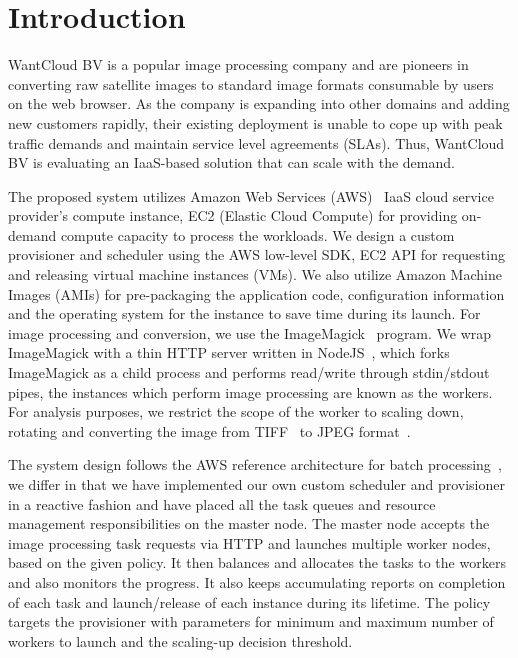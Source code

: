 \documentclass[a4paper]{IEEEtran}
\begin{document}
\section{Introduction}

WantCloud BV is a popular image processing company and are pioneers in converting raw satellite images to standard image formats consumable by users on the web browser. As the company is expanding into other domains and 
adding new customers rapidly, their existing deployment is unable to cope up with peak traffic demands and
 maintain service level agreements (SLAs). Thus, WantCloud BV is evaluating an IaaS-based solution that
 can scale with the demand.

The proposed system utilizes Amazon Web Services (AWS)~\cite{aws} IaaS cloud service provider's compute instance, EC2 (Elastic Cloud Compute) for providing on-demand compute capacity to process the workloads.
We design a custom provisioner and scheduler using the AWS low-level SDK, EC2 API for requesting and releasing virtual machine instances (VMs).
We also utilize Amazon Machine Images (AMIs) for pre-packaging the application code,
configuration information and the operating system for the instance to save time during its launch. For image processing and conversion, we use the ImageMagick~\cite{imagemagick} program. We wrap ImageMagick with a thin HTTP server written in NodeJS~\cite{nodejs}, which forks ImageMagick as a child process and performs read/write through stdin/stdout pipes, the instances which perform image processing are known as
the workers. For analysis purposes, we restrict the scope of the worker to scaling down, rotating and converting the
image from TIFF~\cite{rfc3302} to JPEG format~\cite{jpeg}.

The system design follows the AWS reference architecture for batch processing~\cite{aws_batch}, we differ in that we have
implemented our own custom scheduler and provisioner in a reactive fashion and have placed all the task queues and resource management responsibilities on the master node. The master node accepts the image processing task requests via HTTP and launches multiple worker nodes, based on the given policy. It then balances and allocates the tasks to the workers and also monitors the progress. It also keeps accumulating reports on completion of each task and launch/release of each instance during its lifetime. The policy targets the provisioner with parameters for minimum and maximum
number of workers to launch and the scaling-up decision threshold.
\end{document}

